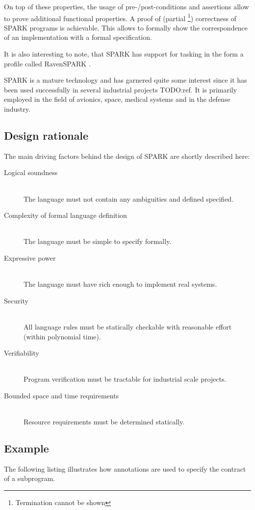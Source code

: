On top of these properties, the usage of pre-/post-conditions and assertions
allow to prove additional functional properties. A proof of (partial
\footnote{Termination cannot be shown}) correctness of SPARK programs is
achievable. This allows to formally show the correspondence of an implementation
with a formal specification.

It is also interesting to note, that SPARK has support for tasking in the form a
profile called RavenSPARK \cite{RavenSPARK}.

SPARK is a mature technology and has garnered quite some interest since it has
been used successfully in several industrial projects TODO:ref. It is primarily
employed in the field of avionics, space, medical systems and in the defense
industry.

\subsection{Design rationale}
The main driving factors behind the design of SPARK are shortly described here:

\begin{description}
	\item[Logical soundness] \hfill \\
		The language must not contain any ambiguities and defined specified.
	\item[Complexity of formal language definition] \hfill \\
		The language must be simple to specify formally.
	\item[Expressive power] \hfill \\
		The language must have rich enough to implement real systems.
	\item[Security] \hfill \\
		All language rules must be statically checkable with reasonable effort
		(within polynomial time).
	\item[Verifiability] \hfill \\
		Program verification must be tractable for industrial scale projects.
	\item[Bounded space and time requirements] \hfill \\
		Resource requirements must be determined statically.
\end{description}

\subsection{Example}
The following listing illustrates how annotations are used to specify the
contract of a subprogram.

